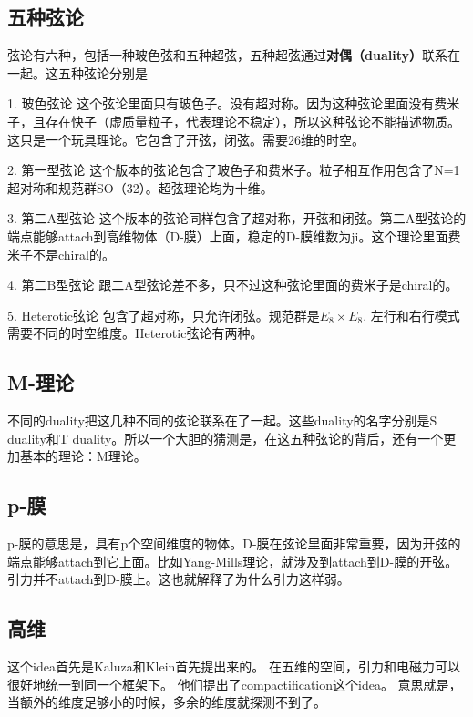 
\begin{issues}
\issueNeedCite
\issueMissDepend
\end{issues}

\subsection{五种弦论}

弦论有六种，包括一种玻色弦和五种超弦，五种超弦通过\textbf{对偶（duality）}联系在一起。这五种弦论分别是

1. 玻色弦论
这个弦论里面只有玻色子。没有超对称。因为这种弦论里面没有费米子，且存在快子（虚质量粒子，代表理论不稳定），所以这种弦论不能描述物质。这只是一个玩具理论。它包含了开弦，闭弦。需要26维的时空。

2. 第一型弦论
这个版本的弦论包含了玻色子和费米子。粒子相互作用包含了N=1超对称和规范群SO（32）。超弦理论均为十维。

3. 第二A型弦论
这个版本的弦论同样包含了超对称，开弦和闭弦。第二A型弦论的端点能够attach到高维物体（D-膜）上面，稳定的D-膜维数为ji。这个理论里面费米子不是chiral的。

4. 第二B型弦论
跟二A型弦论差不多，只不过这种弦论里面的费米子是chiral的。

5. Heterotic弦论
包含了超对称，只允许闭弦。规范群是$E_8\times E_8$. 左行和右行模式需要不同的时空维度。Heterotic弦论有两种。

\subsection{M-理论}
不同的duality把这几种不同的弦论联系在了一起。这些duality的名字分别是S duality和T duality。所以一个大胆的猜测是，在这五种弦论的背后，还有一个更加基本的理论：M理论。

\subsection{p-膜}
p-膜的意思是，具有p个空间维度的物体。D-膜在弦论里面非常重要，因为开弦的端点能够attach到它上面。比如Yang-Mills理论，就涉及到attach到D-膜的开弦。 引力并不attach到D-膜上。这也就解释了为什么引力这样弱。

\subsection{高维}
这个idea首先是Kaluza和Klein首先提出来的。 在五维的空间，引力和电磁力可以很好地统一到同一个框架下。 他们提出了compactification这个idea。
意思就是，当额外的维度足够小的时候，多余的维度就探测不到了。 
